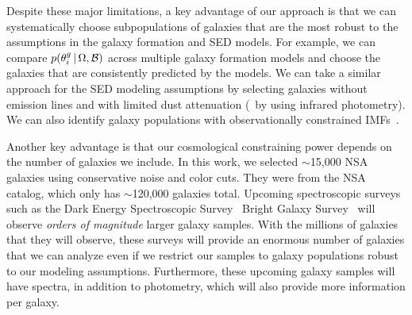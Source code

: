 Despite these major limitations, a key advantage of our approach is that we can
systematically choose subpopulations of galaxies that are the most robust to
the assumptions in the galaxy formation and SED models. 
For example, we can compare 
$p(\theta^g_i\,|\,\Omega, \mathcal{B})$ across multiple galaxy formation
models and choose the galaxies that are consistently predicted by the models. 
We can take a similar approach for the SED modeling assumptions by selecting
galaxies without emission lines and  with limited dust attenuation (\eg~by
using infrared photometry). 
We can also identify galaxy populations with observationally constrained
IMFs~\citep{myers2013, smith2015a}.

Another key advantage is that our cosmological constraining power depends on
the number of galaxies we include. 
In this work, we selected $\sim$15,000 NSA galaxies using conservative noise
and color cuts.
They were from the NSA catalog, which only has $\sim$120,000 galaxies total.
Upcoming spectroscopic surveys such as the Dark Energy Spectroscopic
Survey~\citep[DESI;][]{abareshi2022} 
Bright Galaxy Survey~\citep[BGS;][]{hahn2022c} will observe 
{\em orders of magnitude} larger galaxy samples. 
With the millions of galaxies that they will observe, these surveys will
provide an enormous number of galaxies that we can analyze even if we restrict
our samples to galaxy populations robust to our modeling assumptions.
Furthermore, these upcoming galaxy samples will have spectra, in addition to
photometry, which will also provide more information per galaxy. 
